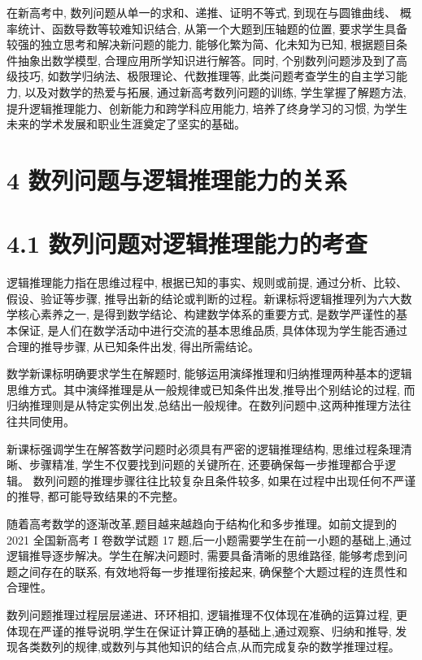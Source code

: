 \documentclass[10pt]{article}
\begin{document}
在新高考中, 数列问题从单一的求和、递推、证明不等式, 到现在与圆锥曲线、 概率统计、函数导数等较难知识结合, 从第一个大题到压轴题的位置, 要求学生具备较强的独立思考和解决新问题的能力, 能够化繁为简、化未知为已知, 根据题目条件抽象出数学模型, 合理应用所学知识进行解答。同时, 个别数列问题涉及到了高级技巧, 如数学归纳法、极限理论、代数推理等, 此类问题考查学生的自主学习能力, 以及对数学的热爱与拓展, 通过新高考数列问题的训练, 学生掌握了解题方法, 提升逻辑推理能力、创新能力和跨学科应用能力, 培养了终身学习的习惯, 为学生未来的学术发展和职业生涯奠定了坚实的基础。

\section*{4 数列问题与逻辑推理能力的关系}

\section*{4.1 数列问题对逻辑推理能力的考查}

逻辑推理能力指在思维过程中, 根据已知的事实、规则或前提, 通过分析、比较、 假设、验证等步骤, 推导出新的结论或判断的过程。新课标将逻辑推理列为六大数学核心素养之一, 是得到数学结论、构建数学体系的重要方式, 是数学严谨性的基本保证, 是人们在数学活动中进行交流的基本思维品质, 具体体现为学生能否通过合理的推导步骤, 从已知条件出发, 得出所需结论。

数学新课标明确要求学生在解题时, 能够运用演绎推理和归纳推理两种基本的逻辑思维方式。其中演绎推理是从一般规律或已知条件出发,推导出个别结论的过程, 而归纳推理则是从特定实例出发,总结出一般规律。在数列问题中,这两种推理方法往往共同使用。

新课标强调学生在解答数学问题时必须具有严密的逻辑推理结构, 思维过程条理清晰、步骤精准, 学生不仅要找到问题的关键所在, 还要确保每一步推理都合乎逻辑。 数列问题的推理步骤往往比较复杂且条件较多, 如果在过程中出现任何不严谨的推导, 都可能导致结果的不完整。

随着高考数学的逐渐改革,题目越来越趋向于结构化和多步推理。如前文提到的 2021 全国新高考 I 卷数学试题 17 题,后一小题需要学生在前一小题的基础上,通过逻辑推导逐步解决。学生在解决问题时, 需要具备清晰的思维路径, 能够考虑到问题之间存在的联系, 有效地将每一步推理衔接起来, 确保整个大题过程的连贯性和合理性。

数列问题推理过程层层递进、环环相扣, 逻辑推理不仅体现在准确的运算过程, 更体现在严谨的推导说明,学生在保证计算正确的基础上,通过观察、归纳和推导, 发现各类数列的规律,或数列与其他知识的结合点,从而完成复杂的数学推理过程。
\end{document}
